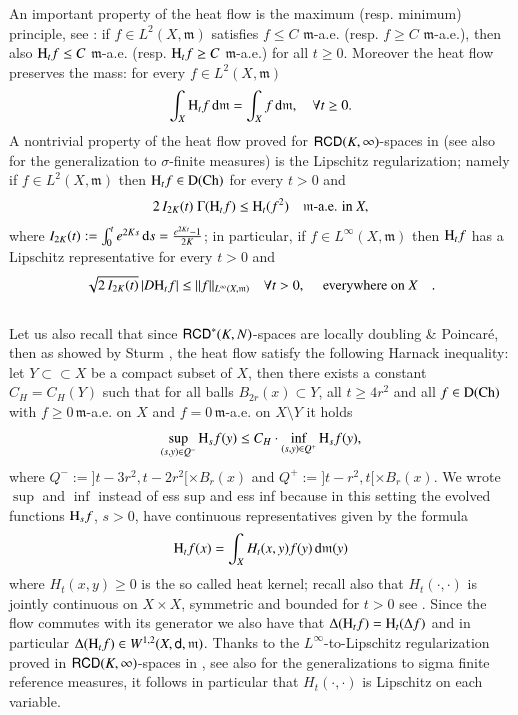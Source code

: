 \documentclass[11pt,reqno]{amsart}
\newcommand{\Ch}{{\rm Ch}}
\newcommand{\dom}{\rm D}
\newcommand{\mm}{\mathfrak m}
\newcommand{\sfd}{{\sf d}}
\renewcommand{\H}{{\rm H}}
\renewcommand{\d}{{\rm{d}}}
\newcommand{\RCD}{{\sf RCD}}
\theoremstyle{definition}
\theoremstyle{remark}
\theoremstyle{remark}
\theoremstyle{remark}
\theoremstyle{remark}
\theoremstyle{remark}
\theoremstyle{remark}
\theoremstyle{remark}
\begin{document}
An important property of the heat flow is the maximum (resp. minimum) principle, see   \cite[Theorem 4.16]{AGS11a}: if $f\in L^2(X,\mm)$ satisfies $f \leq C$ $\mm$-a.e. (resp. $f \geq C$ $\mm$-a.e.), then also $\H_t f \leq C$ $\mm$-a.e.  (resp. $\H_t f \geq C$ $\mm$-a.e.) for all $t \geq 0$. Moreover the heat flow preserves the mass:  for every $f \in L^2(X,\mm)$ 
$$\int_X \H_t f \, \d \mm=\int_X f \, \d \mm, \quad \forall t \geq 0.$$ 
A nontrivial property of the heat flow proved for $\RCD(K,\infty)$-spaces in \cite[Theorem 6.8]{AGS11b} (see also \cite{AGMR2012} for the generalization to $\sigma$-finite measures) is the Lipschitz regularization; namely if $f\in L^2(X,\mm)$ then $\H_t f \in \dom(\Ch)$ for every $t>0$ and 
$$2 \,I_{2K}(t) \; \Gamma(\H_t f) \leq \H_t(f^2) \quad \mm\text{-a.e. in } X,$$
where $I_{2K}(t):=\int_0^t e^{2Ks} \, \d s= \frac{e^{2Kt}-1}{2K}$; in particular, if $f \in L^\infty(X,\mm)$ then $\H_t f$ has a Lipschitz representative for every $t>0$ and 
\begin{equation}\label{eq:LipRegHeat}
\sqrt{2\, I_{2K}(t)} \,  | D\H_t f| \leq \|f\|_{L^\infty(X,\mm)} \quad \forall t>0, \quad \text{ everywhere on } X\quad.
\end{equation}
\\Let us also recall that since $\RCD^*(K,N)$-spaces are locally doubling \& Poincar\'e, then as showed by Sturm \cite[Theorem 3.5]{Sturm96}, the heat flow satisfy the following Harnack inequality: let $Y\subset \subset X$ be a compact subset of $X$, then there exists a constant $C_H=C_H(Y)$ such that for all balls $B_{2r}(x) \subset Y$, all $t\geq 4r^2$ and all $f\in \dom(\Ch)$ with $f\geq 0 \, \mm$-a.e. on $X$ and $f=0 \, \mm$-a.e. on $X\setminus Y$  it holds
\begin{equation}\label{eq:ParHarnack}
\sup_{(s,y) \in Q^-} \H_s f (y) \leq C_H \cdot \inf_{(s,y)\in Q^+} \H_s f(y),
\end{equation}
where $Q^-:=]t-3r^2, t-2r^2[ \times B_r(x)$ and $Q^+:=]t-r^2,t[\times B_r(x)$. We wrote $\sup$ and $\inf$ instead of ess sup and ess inf because in this setting the evolved functions $\H_s f$, $s>0$, have continuous representatives \cite[Proposition 3.1]{Sturm96} given by the formula
\begin{equation}
\H_t f(x)= \int_X H_t(x,y) f(y) \, \d\mm(y)
\end{equation}
where $H_t(x,y)\geq 0$ is the so called heat kernel; recall also that $H_t(\cdot,\cdot)$ is jointly continuous on $X\times X$, symmetric and bounded for $t>0$ see \cite[Section 4]{Sturm96}. Since the flow commutes with its generator we also have that $\Delta (\H_t f)=\H_t(\Delta f)$ and in particular $\Delta (\H_t f)\in W^{1,2}(X,\sfd,\mm)$. Thanks to the $L^\infty$-to-Lipschitz regularization proved in $\RCD(K,\infty)$-spaces in \cite[Theorem 6.8]{AGS11b}, see also \cite{AGMR2012} for the generalizations to  sigma finite reference measures, it follows in particular that $H_t(\cdot,\cdot)$ is  Lipschitz on each variable. 
\end{document}
